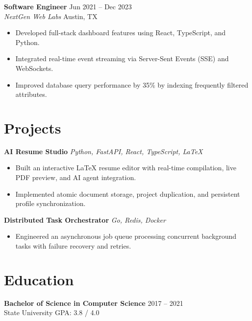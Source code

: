 \documentclass[11pt,a4paper]{article}
\begin{document}
\vspace{4pt}
\textbf{Software Engineer} \hfill Jun 2021 -- Dec 2023 \\
\textit{NextGen Web Labs} \hfill Austin, TX
\begin{itemize}
    \item Developed full-stack dashboard features using React, TypeScript, and Python.
    \item Integrated real-time event streaming via Server-Sent Events (SSE) and WebSockets.
    \item Improved database query performance by 35\% by indexing frequently filtered attributes.
\end{itemize}

\section*{Projects}
\textbf{AI Resume Studio} \hfill \textit{Python, FastAPI, React, TypeScript, LaTeX}
\begin{itemize}
    \item Built an interactive LaTeX resume editor with real-time compilation, live PDF preview, and AI agent integration.
    \item Implemented atomic document storage, project duplication, and persistent profile synchronization.
\end{itemize}

\vspace{4pt}
\textbf{Distributed Task Orchestrator} \hfill \textit{Go, Redis, Docker}
\begin{itemize}
    \item Engineered an asynchronous job queue processing concurrent background tasks with failure recovery and retries.
\end{itemize}

\section*{Education}
\textbf{Bachelor of Science in Computer Science} \hfill 2017 -- 2021 \\
State University \hfill GPA: 3.8 / 4.0
\end{document}
